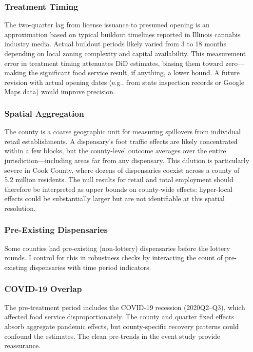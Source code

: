 \documentclass[12pt]{article}
\begin{document}
\subsubsection*{Treatment Timing} The two-quarter lag from license issuance to presumed opening is an approximation based on typical buildout timelines reported in Illinois cannabis industry media. Actual buildout periods likely varied from 3 to 18 months depending on local zoning complexity and capital availability. This measurement error in treatment timing attenuates DiD estimates, biasing them toward zero—making the significant food service result, if anything, a lower bound. A future revision with actual opening dates (e.g., from state inspection records or Google Maps data) would improve precision.

\subsubsection*{Spatial Aggregation} The county is a coarse geographic unit for measuring spillovers from individual retail establishments. A dispensary's foot traffic effects are likely concentrated within a few blocks, but the county-level outcome averages over the entire jurisdiction—including areas far from any dispensary. This dilution is particularly severe in Cook County, where dozens of dispensaries coexist across a county of 5.2 million residents. The null results for retail and total employment should therefore be interpreted as upper bounds on county-wide effects; hyper-local effects could be substantially larger but are not identifiable at this spatial resolution.

\subsubsection*{Pre-Existing Dispensaries} Some counties had pre-existing (non-lottery) dispensaries before the lottery rounds. I control for this in robustness checks by interacting the count of pre-existing dispensaries with time period indicators.

\subsubsection*{COVID-19 Overlap} The pre-treatment period includes the COVID-19 recession (2020Q2--Q3), which affected food service disproportionately. The county and quarter fixed effects absorb aggregate pandemic effects, but county-specific recovery patterns could confound the estimates. The clean pre-trends in the event study provide reassurance.
\end{document}
